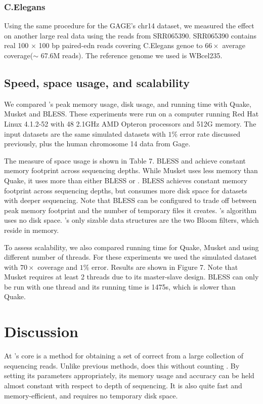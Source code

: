 \documentclass{bmcart}
\begin{document}
\subsubsection*{C.Elegans} %
Using the same procedure for the GAGE's chr14 dataset, we measured the effect on another large real data using the reads from SRR065390. SRR065390 contains real 100 $\times$ 100 bp paired-edn reads covering C.Elegans genoe to $66\times$ average coverage($\sim$ 67.6M reads). The reference genome we used is WBcel235. 

\subsection*{Speed, space usage, and scalability}

We compared \tool's peak memory usage, disk usage, and running time with Quake, Musket and BLESS.  These experiments were run on a computer running Red Hat Linux 4.1.2-52 with 48 2.1GHz AMD Opteron processors and 512G memory.
The input datasets are the same simulated \ecoli datasets with $1\%$ error rate discussed previously, plus the human chromosome 14 data from Gage.

The measure of space usage is shown in Table 7. BLESS and \tool achieve constant memory footprint across sequencing depths.  While Musket uses less memory than Quake, it uses more than either BLESS or \tool.  BLESS achieves constant memory footprint across sequencing depths, but consumes more disk space for datasets with deeper sequencing.  Note that BLESS can be configured to trade off between peak memory footprint and the number of temporary files it creates.  \tool's algorithm uses no disk space.  \tool's only sizable data structures are the two Bloom filters, which reside in memory.

To assess scalability, we also compared running time for Quake, Musket and \tool using different number of threads.  For these experiments we used the simulated \ecoli dataset with $70\times$ coverage and $1\%$ error.  Results are shown in Figure 7.  Note that Musket requires at least 2 threads due to its master-slave design.  BLESS can only be run with one thread and its running time is 1475s, which is slower than Quake.


\section*{Discussion}
At \tool's core is a method for obtaining a set of correct \kmers from a large collection of sequencing reads.
Unlike previous methods, \tool does this without counting \kmers.
By setting its parameters appropriately, its memory usage and accuracy can be held almost constant with respect to depth of sequencing.
It is also quite fast and memory-efficient, and requires no temporary disk space.
\end{document}
